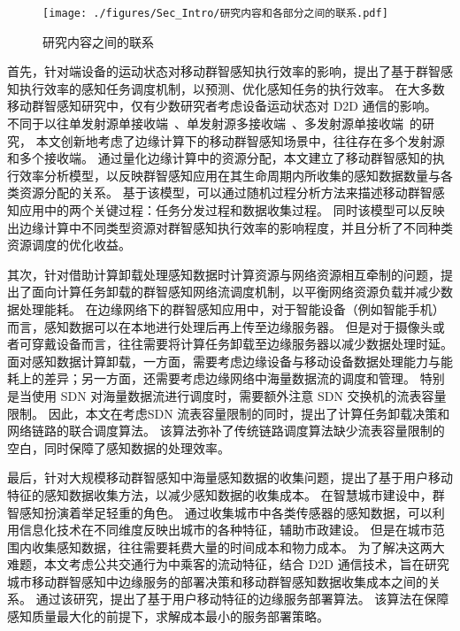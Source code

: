 \begin{figure}[!h]
  \centering
  \texttt{[image: ./figures/Sec\_Intro/研究内容和各部分之间的联系.pdf]}
  \caption{研究内容之间的联系}
  \vspace{-1em}
  \label{Figure_Re_Part}
\end{figure}

首先，针对端设备的运动状态对移动群智感知执行效率的影响，提出了基于群智感知执行效率的感知任务调度机制，以预测、优化感知任务的执行效率。
在大多数移动群智感知研究中，仅有少数研究者考虑设备运动状态对 D2D 通信的影响。
不同于以往单发射源单接收端~\cite{DBLP:journals/twc/LiW14}、单发射源多接收端~\cite{DBLP:conf/wasa/Yan0WWW17}、多发射源单接收端~\cite{DBLP:journals/tpds/ZhaoMTL15}的研究，
本文创新地考虑了边缘计算下的移动群智感知场景中，往往存在多个发射源和多个接收端。
通过量化边缘计算中的资源分配，本文建立了移动群智感知的执行效率分析模型，以反映群智感知应用在其生命周期内所收集的感知数据数量与各类资源分配的关系。
基于该模型，可以通过随机过程分析方法来描述移动群智感知应用中的两个关键过程：任务分发过程和数据收集过程。
同时该模型可以反映出边缘计算中不同类型资源对群智感知执行效率的影响程度，并且分析了不同种类资源调度的优化收益。

其次，针对借助计算卸载处理感知数据时计算资源与网络资源相互牵制的问题，提出了面向计算任务卸载的群智感知网络流调度机制，以平衡网络资源负载并减少数据处理能耗。
在边缘网络下的群智感知应用中，对于智能设备（例如智能手机）而言，感知数据可以在本地进行处理后再上传至边缘服务器。
但是对于摄像头或者可穿戴设备而言，往往需要将计算任务卸载至边缘服务器以减少数据处理时延。
面对感知数据计算卸载，一方面，需要考虑边缘设备与移动设备数据处理能力与能耗上的差异；另一方面，还需要考虑边缘网络中海量数据流的调度和管理。
特别是当使用 SDN 对海量数据流进行调度时，需要额外注意 SDN 交换机的流表容量限制。
因此，本文在考虑SDN 流表容量限制的同时，提出了计算任务卸载决策和网络链路的联合调度算法。
该算法弥补了传统链路调度算法缺少流表容量限制的空白，同时保障了感知数据的处理效率。

最后，针对大规模移动群智感知中海量感知数据的收集问题，提出了基于用户移动特征的感知数据收集方法，以减少感知数据的收集成本。
在智慧城市建设中，群智感知扮演着举足轻重的角色。
通过收集城市中各类传感器的感知数据，可以利用信息化技术在不同维度反映出城市的各种特征，辅助市政建设。
但是在城市范围内收集感知数据，往往需要耗费大量的时间成本和物力成本。
为了解决这两大难题，本文考虑公共交通行为中乘客的流动特征，结合 D2D 通信技术，旨在研究城市移动群智感知中边缘服务的部署决策和移动群智感知数据收集成本之间的关系。
通过该研究，提出了基于用户移动特征的边缘服务部署算法。
该算法在保障感知质量最大化的前提下，求解成本最小的服务部署策略。

